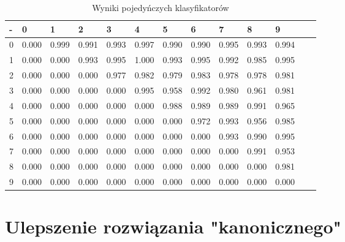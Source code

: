 \documentclass[a4paper]{article}
\begin{document}
\begin{table}[H]
    \caption{Wyniki pojedyńczych klasyfikatorów
    \label{table:indiv}
    }
\begin{center}
    \begin{tabular}{| l | l | l | l | l | l | l | l | l | l | l | l | l |}
    \hline
        - & 0 & 1 & 2 & 3 & 4 & 5 & 6 & 7 & 8 & 9 \\
    \hline
 0 &  0.000 & 0.999 & 0.991 & 0.993 & 0.997 & 0.990 & 0.990 & 0.995 & 0.993 & 0.994 \\
 1 &  0.000 & 0.000 & 0.993 & 0.995 & 1.000 & 0.993 & 0.995 & 0.992 & 0.985 & 0.995 \\
 2 &  0.000 & 0.000 & 0.000 & 0.977 & 0.982 & 0.979 & 0.983 & 0.978 & 0.978 & 0.981 \\
 3 &  0.000 & 0.000 & 0.000 & 0.000 & 0.995 & 0.958 & 0.992 & 0.980 & 0.961 & 0.981 \\
 4 &  0.000 & 0.000 & 0.000 & 0.000 & 0.000 & 0.988 & 0.989 & 0.989 & 0.991 & 0.965 \\
 5 &  0.000 & 0.000 & 0.000 & 0.000 & 0.000 & 0.000 & 0.972 & 0.993 & 0.956 & 0.985 \\
 6 &  0.000 & 0.000 & 0.000 & 0.000 & 0.000 & 0.000 & 0.000 & 0.993 & 0.990 & 0.995 \\
 7 &  0.000 & 0.000 & 0.000 & 0.000 & 0.000 & 0.000 & 0.000 & 0.000 & 0.991 & 0.953 \\
 8 &  0.000 & 0.000 & 0.000 & 0.000 & 0.000 & 0.000 & 0.000 & 0.000 & 0.000 & 0.981 \\
 9 &  0.000 & 0.000 & 0.000 & 0.000 & 0.000 & 0.000 & 0.000 & 0.000 & 0.000 & 0.000 \\
    \hline
    \end{tabular}
\end{center}
\end{table}


\section{Ulepszenie rozwiązania "kanonicznego"}
\label{improved}
\end{document}

